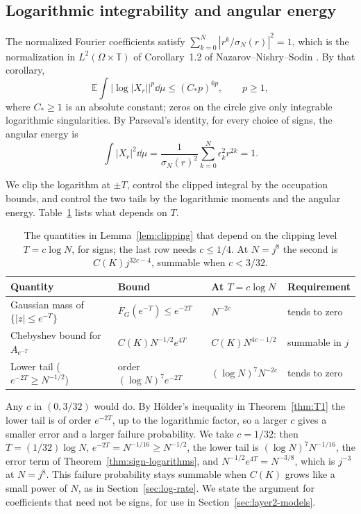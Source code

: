 \subsection{Logarithmic integrability and angular energy}\label{sec:log-integrability}
The normalized Fourier coefficients satisfy
$\sum_{k=0}^N|r^k/\sigma_N(r)|^2=1$, which is the normalization in
$L^2(\Omega\times\mathbb T)$ of Corollary~1.2 of Nazarov--Nishry--Sodin
\cite{NNS2013}. By that corollary,
\begin{equation}
 \mathbb E\int |\log|X_r||^p\dd\mu\le(C_*p)^{6p},\qquad p\ge1,
                                                        \label{eq:layer2-nns}
\end{equation}
where $C_*\ge1$ is an absolute constant; zeros on the circle give only
integrable logarithmic singularities. By Parseval's identity, for every
choice of signs, the angular energy is
\begin{equation}
 \int|X_r|^2\dd\mu=\frac1{\sigma_N(r)^2}\sum_{k=0}^N\epsilon_k^2r^{2k}=1.
                                                        \label{eq:layer2-energy}
\end{equation}

We clip the logarithm at $\pm T$, control the clipped integral by the
occupation bounds, and control the two tails by the logarithmic moments
and the angular energy. Table~\ref{tab:clipping-level} lists what depends
on $T$.
\begin{table}[ht]
\centering
\small
\setlength{\tabcolsep}{4pt}
\begin{tabular}{@{}llll@{}}
\toprule
Quantity & Bound & At $T=c\log N$ & Requirement\\
\midrule
Gaussian mass of $\{|z|\le e^{-T}\}$ & $F_G(e^{-T})\le e^{-2T}$ & $N^{-2c}$ & tends to zero\\
Chebyshev bound for $A_{e^{-T}}$ & $C(K)N^{-1/2}e^{4T}$ & $C(K)N^{4c-1/2}$ & summable in $j$\\
Lower tail ($e^{-2T}\ge N^{-1/2}$) & order $(\log N)^7e^{-2T}$ & $(\log N)^7N^{-2c}$ & tends to zero\\
\bottomrule
\end{tabular}
\caption{The quantities in Lemma~\ref{lem:clipping} that depend on the
clipping level $T=c\log N$, for signs; the last row needs $c\le1/4$.
At $N=j^8$ the second is $C(K)j^{32c-4}$, summable when $c<3/32$.}
\label{tab:clipping-level}
\end{table}
Any $c$ in $(0,3/32)$ would do. By H\"older's inequality in
Theorem~\ref{thm:T1} the lower tail is of order $e^{-2T}$, up to the
logarithmic factor, so a larger $c$ gives a smaller error and a larger
failure probability. We take $c=1/32$: then $T=(1/32)\log N$,
$e^{-2T}=N^{-1/16}\ge N^{-1/2}$, the lower tail is
$(\log N)^7N^{-1/16}$, the error term of
Theorem~\ref{thm:sign-logarithms}, and
$N^{-1/2}e^{4T}=N^{-3/8}$, which is $j^{-3}$ at $N=j^8$. This failure
probability stays summable when $C(K)$ grows like a small power of $N$,
as in Section~\ref{sec:log-rate}.
We state the argument for coefficients that need not be signs, for use in
Section~\ref{sec:layer2-models}.

